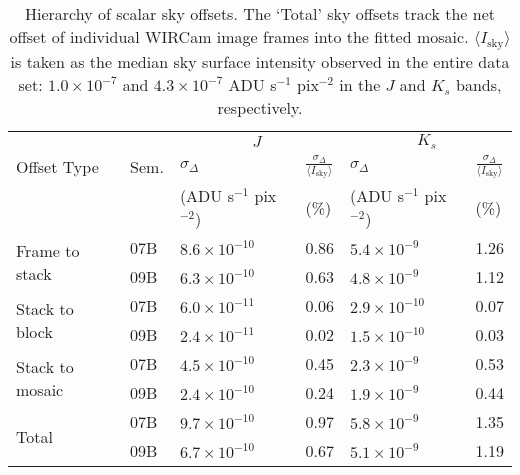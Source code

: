 \documentclass[iop]{emulateapj}
\begin{document}
\begin{table}[t]
    \centering
    \caption[Hierarchy of scalar sky offsets]{Hierarchy of scalar sky offsets. The `Total' sky offsets track the net offset of individual WIRCam image frames into the fitted mosaic. $\langle I_\mathrm{sky}\rangle$ is taken as the median sky surface intensity observed in the entire data set: $1.0\times 10^{-7}$ and $4.3\times 10^{-7}$ ADU s$^{-1}$ pix$^{-2}$ in the $J$ and $K_s$ bands, respectively.}
    \label{tab:offset_hierarchy}
\begin{tabular}{ll|ll|ll}
 &  & \multicolumn{2}{c|}{$J$} & \multicolumn{2}{c}{$K_s$} \\ %
Offset Type & Sem. & $\sigma_\Delta$ & $\frac{\sigma_\Delta}{\langle I_\mathrm{sky}\rangle }$ & $\sigma_\Delta$ & $\frac{\sigma_\Delta}{\langle I_\mathrm{sky}\rangle }$ \\
 & & \tiny{(ADU s$^{-1}$ pix$^{-2}$)} &  \tiny{(\%)} & \tiny{(ADU s$^{-1}$ pix$^{-2}$)} &  \tiny{(\%)} \\
\hline
\multirow{2}{*}{Frame to stack} & 07B & $8.6\times 10^{-10}$ & 0.86 & $5.4\times 10^{-9}$ & 1.26\\
 & 09B  & $6.3\times 10^{-10}$ & 0.63 & $4.8\times 10^{-9}$ & 1.12\\
\hline
\multirow{2}{*}{Stack to block} & 07B & $6.0\times 10^{-11}$ & 0.06 & $2.9\times 10^{-10}$ & 0.07\\
  & 09B & $2.4\times 10^{-11}$ & 0.02 & $1.5\times 10^{-10}$ & 0.03\\
\hline
\multirow{2}{*}{Stack to mosaic} & 07B & $4.5\times 10^{-10}$ & 0.45 & $2.3\times 10^{-9}$ & 0.53\\
  & 09B & $2.4\times 10^{-10}$ & 0.24 & $1.9\times 10^{-9}$ & 0.44\\
\hline
\multirow{2}{*}{Total} & 07B & $9.7\times 10^{-10}$ & 0.97 & $5.8\times 10^{-9}$ & 1.35 \\
  & 09B & $6.7\times 10^{-10}$ & 0.67 & $5.1\times 10^{-9}$ & 1.19 \\
\end{tabular}


\end{table}
\end{document}
